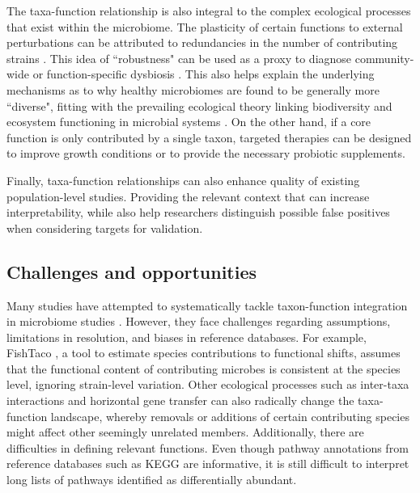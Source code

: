 The taxa-function relationship is also integral to the complex ecological processes that exist within the microbiome. The plasticity of certain functions to external perturbations can be attributed to redundancies in the number of contributing strains \cite{walker1992biodiversity, moya2016functional}. This idea of ``robustness" \cite{eng2018taxafunction} can be used as a proxy to diagnose community-wide or function-specific dysbiosis \cite{vieira-silva2016species}. This also helps explain the underlying mechanisms as to why healthy microbiomes are found to be generally more ``diverse", fitting with the prevailing ecological theory linking biodiversity and ecosystem functioning in microbial systems \cite{tilman2014biodiversity}. On the other hand, if a core function is only contributed by a single taxon, targeted therapies can be designed to improve growth conditions or to provide the necessary probiotic supplements.  

Finally, taxa-function relationships can also enhance quality of existing population-level studies. Providing the relevant context that can increase interpretability, while also help researchers distinguish possible false positives when considering targets for validation. 

\subsection{Challenges and opportunities}

Many studies have attempted to systematically tackle taxon-function integration in microbiome studies \cite{manor2017systematic, vieira-silva2016species, eng2018taxafunction, noecker2019defining}. However, they face challenges regarding assumptions, limitations in resolution, and biases in reference databases. For example, FishTaco \cite{manor2017systematic}, a tool to estimate species contributions to functional shifts, assumes that the functional content of contributing microbes is consistent at the species level, ignoring strain-level variation. Other ecological processes such as inter-taxa interactions and horizontal gene transfer can also radically change the taxa-function landscape, whereby removals or additions of certain contributing species might affect other seemingly unrelated members. Additionally, there are difficulties in defining relevant functions. Even though pathway annotations from reference databases such as KEGG are informative, it is still difficult to interpret long lists of pathways identified as differentially abundant. 

